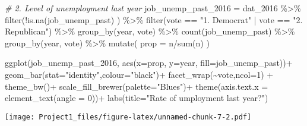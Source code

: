 \documentclass[
]{article}
\newenvironment{Shaded}{\begin{snugshade}}{\end{snugshade}}
\newcommand{\AttributeTok}[1]{\textcolor[rgb]{0.77,0.63,0.00}{#1}}
\newcommand{\CommentTok}[1]{\textcolor[rgb]{0.56,0.35,0.01}{\textit{#1}}}
\newcommand{\DecValTok}[1]{\textcolor[rgb]{0.00,0.00,0.81}{#1}}
\newcommand{\FunctionTok}[1]{\textcolor[rgb]{0.00,0.00,0.00}{#1}}
\newcommand{\NormalTok}[1]{#1}
\newcommand{\OtherTok}[1]{\textcolor[rgb]{0.56,0.35,0.01}{#1}}
\newcommand{\SpecialCharTok}[1]{\textcolor[rgb]{0.00,0.00,0.00}{#1}}
\newcommand{\StringTok}[1]{\textcolor[rgb]{0.31,0.60,0.02}{#1}}
\begin{document}
\begin{Shaded}
\begin{Highlighting}[]
\CommentTok{\# 2. Level of unemployment last year}
\NormalTok{job\_unemp\_past\_2016 }\OtherTok{=}\NormalTok{ dat\_2016 }\SpecialCharTok{\%\textgreater{}\%}
  \FunctionTok{filter}\NormalTok{(}\SpecialCharTok{!}\FunctionTok{is.na}\NormalTok{(job\_unemp\_past) ) }\SpecialCharTok{\%\textgreater{}\%}
  \FunctionTok{filter}\NormalTok{(vote }\SpecialCharTok{==} \StringTok{"1. Democrat"} \SpecialCharTok{|}\NormalTok{ vote }\SpecialCharTok{==} \StringTok{"2. Republican"}\NormalTok{) }\SpecialCharTok{\%\textgreater{}\%}
  \FunctionTok{group\_by}\NormalTok{(year, vote) }\SpecialCharTok{\%\textgreater{}\%}
  \FunctionTok{count}\NormalTok{(job\_unemp\_past) }\SpecialCharTok{\%\textgreater{}\%}
  \FunctionTok{group\_by}\NormalTok{(year, vote) }\SpecialCharTok{\%\textgreater{}\%}
  \FunctionTok{mutate}\NormalTok{(}
    \AttributeTok{prop =}\NormalTok{ n}\SpecialCharTok{/}\FunctionTok{sum}\NormalTok{(n)}
\NormalTok{  )}

\FunctionTok{ggplot}\NormalTok{(job\_unemp\_past\_2016,}
       \FunctionTok{aes}\NormalTok{(}\AttributeTok{x=}\NormalTok{prop, }\AttributeTok{y=}\NormalTok{year, }\AttributeTok{fill=}\NormalTok{job\_unemp\_past))}\SpecialCharTok{+}
  \FunctionTok{geom\_bar}\NormalTok{(}\AttributeTok{stat=}\StringTok{"identity"}\NormalTok{,}\AttributeTok{colour=}\StringTok{"black"}\NormalTok{)}\SpecialCharTok{+}
  \FunctionTok{facet\_wrap}\NormalTok{(}\SpecialCharTok{\textasciitilde{}}\NormalTok{vote,}\AttributeTok{ncol=}\DecValTok{1}\NormalTok{) }\SpecialCharTok{+}
  \FunctionTok{theme\_bw}\NormalTok{()}\SpecialCharTok{+}
  \FunctionTok{scale\_fill\_brewer}\NormalTok{(}\AttributeTok{palette=}\StringTok{"Blues"}\NormalTok{)}\SpecialCharTok{+}
  \FunctionTok{theme}\NormalTok{(}\AttributeTok{axis.text.x =} \FunctionTok{element\_text}\NormalTok{(}\AttributeTok{angle =} \DecValTok{0}\NormalTok{))}\SpecialCharTok{+}
  \FunctionTok{labs}\NormalTok{(}\AttributeTok{title=}\StringTok{"Rate of umployment last year?"}\NormalTok{)}
\end{Highlighting}
\end{Shaded}

\texttt{[image: Project1\_files/figure-latex/unnamed-chunk-7-2.pdf]}
\end{document}
